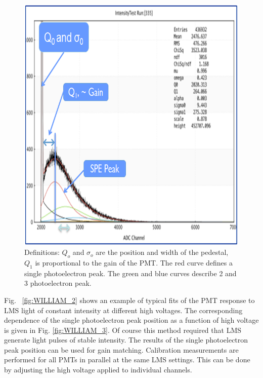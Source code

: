 \begin{figure}[!h]
    \centering
    \includegraphics[width=1.0\linewidth,trim={0.0cm 0.0cm 0.0cm 0.0cm},clip]{images/WILLIAM_1.png}
    \caption{Definitions: $Q_{o}$ and $\sigma_{o}$ are the position and width of the pedestal, $Q_{ 1}$ is proportional to the gain of the PMT. The red curve defines a single photoelectron peak. The green and blue curves describe 2 and 3 photoelectron peak.}
    \label{fig:WILLIAM_1}
\end{figure}

Fig. ~\ref{fig:WILLIAM_2} shows an example of typical fits of the PMT response to LMS light of constant intensity at different high voltages. The corresponding dependence of the single photoelectron peak position as a function of high voltage is given in Fig. \ref{fig:WILLIAM_3}. Of course this method required that LMS generate light pulses of stable intensity. The results of the single photoelectron peak position can be used for gain matching. Calibration measurements are performed for all PMTs in parallel at the same LMS settings. This can be done by adjusting the high voltage applied to individual channels.

